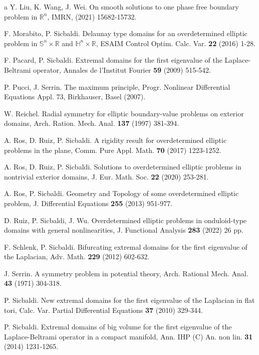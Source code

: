 \documentclass[reqno]{amsart}
\numberwithin{equation}{section}
\newenvironment{key words}{\textbf{Keywords}\mbox{  }}{ }
\begin{document}
\begin{thebibliography}{a}
 Y. Liu, K. Wang, J. Wei. On smooth solutions to one phase free boundary problem in $\mathbb{R}^n$, IMRN, (2021) 15682-15732.

 F. Morabito, P. Sicbaldi. Delaunay type domains for an overdetermined elliptic problem in $\mathbb{S}^{n}\times\mathbb{R}$ and $\mathbb{H}^{n}\times\mathbb{R}$, ESAIM Control Optim. Calc. Var. {\bf 22} (2016) 1-28.

 F. Pacard, P. Sicbaldi. Extremal domains for the first eigenvalue of the Laplace-Beltrami operator, Annales de l'Institut Fourier {\bf 59} (2009) 515-542.

 P. Pucci, J. Serrin. The maximum principle, Progr. Nonlinear Differential Equations Appl. 73, Birkhauser, Basel (2007).

 W. Reichel. Radial symmetry for elliptic boundary-value problems on exterior domains, Arch. Ration. Mech. Anal. {\bf 137} (1997) 381-394.

 A. Ros, D. Ruiz, P. Sicbaldi. A rigidity result for overdetermined elliptic problems in the plane, Comm. Pure Appl. Math. {\bf 70} (2017) 1223-1252.

 A. Ros, D. Ruiz, P. Sicbaldi. Solutions to overdetermined elliptic problems in nontrivial exterior domains, J. Eur. Math. Soc. {\bf 22} (2020) 253-281.

 A. Ros, P. Sicbaldi. Geometry and Topology of some overdetermined elliptic problem, J. Differential Equations {\bf 255} (2013) 951-977.

 D. Ruiz, P. Sicbaldi, J. Wu. Overdetermined elliptic problems in onduloid-type domains with general nonlinearities, J. Functional Analysis {\bf 283} (2022) 26 pp.

 F. Schlenk, P. Sicbaldi. Bifurcating extremal domains for the first eigenvalue of the Laplacian, Adv. Math. {\bf 229} (2012) 602-632.

 J. Serrin. A symmetry problem in potential theory, Arch. Rational Mech. Anal. {\bf 43} (1971) 304-318.

 P. Sicbaldi. New extremal domains for the first eigenvalue of the Laplacian in flat tori, Calc. Var. Partial Differential Equations {\bf 37} (2010) 329-344.

 P. Sicbaldi. Extremal domains of big volume for the first eigenvalue of the Laplace-Beltrami operator in a compact manifold, Ann. IHP (C) An. non lin. {\bf 31} (2014) 1231-1265.


\end{thebibliography}
\end{document}
